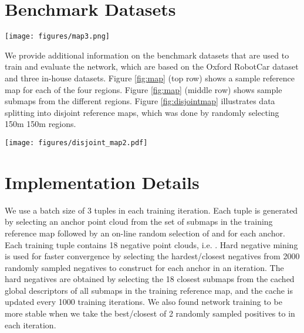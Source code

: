 \documentclass[10pt,twocolumn,letterpaper]{article}
\begin{document}
	\section{Benchmark Datasets}
	\begin{figure*}
		\begin{center}
			\texttt{[image: figures/map3.png]}
		\end{center}
		\caption{Top row shows a sample reference map from (a) Oxford, (b) U.S., (c) R.A and (d) B.D.. Middle row shows a sample submap from each of the regions representing the local area marked by the red box on the reference map. Bottom row shows the corresponding preprocessed submaps of the local areas from the middle row. }
		\label{fig:map}
	\end{figure*}
	We provide additional information on the benchmark datasets that are used to train and evaluate the network, which are based on the Oxford RobotCar dataset \cite{RobotCarDatasetIJRR} and three in-house datasets. Figure \ref{fig:map} (top row) shows a sample reference map for each of the four regions. Figure \ref{fig:map} (middle row) shows sample submaps from the different regions. Figure \ref{fig:disjointmap} illustrates data splitting into disjoint reference maps, which was done by randomly selecting 150m  150m regions.
	\newline
	\begin{figure*}
		\begin{center}
			\texttt{[image: figures/disjoint\_map2.pdf]}
		\end{center}
		\caption{Data splitting: Blue points represent submaps in the training reference map and red points represent submaps in the testing reference map. The data split was done by randomly selecting regions in the full reference map. }
		\label{fig:disjointmap}
	\end{figure*}

	\section{Implementation Details}
	We use a batch size of 3 tuples in each training iteration. Each tuple is generated by selecting an anchor point cloud  from the set of submaps in the training reference map followed by an on-line random selection of  and  for each anchor. Each training tuple contains 18 negative point clouds, i.e. . Hard negative mining is used for faster convergence by selecting the hardest/closest negatives from 2000 randomly sampled negatives to construct  for each anchor  in an iteration. The hard negatives are obtained by selecting the 18 closest submaps from the cached global descriptors  of all submaps in the training reference map, and the cache is updated every 1000 training iterations. We also found network training to be more stable when we take the best/closest of 2 randomly sampled positives to  in each iteration.
	
\end{document}
